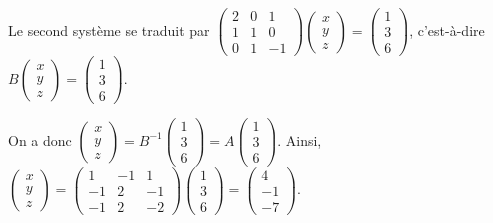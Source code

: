 \documentclass[11pt,fleqn]{book} %
\begin{document}
\begin{solution}
Le second système se traduit par $\begin{pmatrix}2 & 0 & 1 \\ 1&1&0 \\ 0& 1& -1\end{pmatrix}\begin{pmatrix}x\\y\\z\end{pmatrix}=\begin{pmatrix}1\\3\\6\end{pmatrix}$, c'est-à-dire $B\begin{pmatrix}x\\y\\z\end{pmatrix}=\begin{pmatrix}1\\3\\6\end{pmatrix}$. 

On a donc $\begin{pmatrix}x\\y\\z\end{pmatrix}=B^{-1}\begin{pmatrix}1\\3\\6\end{pmatrix}=A\begin{pmatrix}1\\3\\6\end{pmatrix}$. Ainsi, $\begin{pmatrix}x\\y\\z\end{pmatrix}=\begin{pmatrix}1 & -1 & 1\\ -1 & 2 & -1 \\ -1 & 2 & -2\end{pmatrix}\begin{pmatrix}1\\3\\6\end{pmatrix}=\begin{pmatrix}
4\\-1\\-7\end{pmatrix}$.\end{solution}
\end{document}
